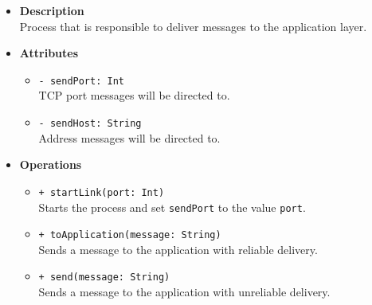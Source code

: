 \FloatBarrier
\begin{itemize}
  \item \textbf{Description} \\
    Process that is responsible to deliver messages to the application layer.
  \item \textbf{Attributes}
    \begin{itemize}
      \item \texttt{- sendPort: Int} \\
    TCP port messages will be directed to.
      \item \texttt{- sendHost: String} \\
    Address messages will be directed to.
    \end{itemize}
  \item \textbf{Operations}
  \begin{itemize}
    \item \texttt{+ startLink(port: Int)} \\
    Starts the process and set \texttt{sendPort} to the value \texttt{port}.
    \item \texttt{+ toApplication(message: String)} \\
    Sends a message to the application with reliable delivery.
    \item \texttt{+ send(message: String)} \\
    Sends a message to the application with unreliable delivery.
  \end{itemize}
\end{itemize}

